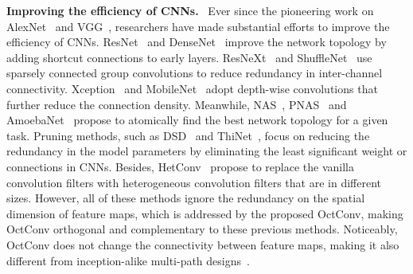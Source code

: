 \documentclass[10pt,twocolumn,letterpaper]{article}
\newcommand{\hiConv}[0]{OctConv\xspace}
\newcommand{\myparagraph}[1]{\vspace{1pt}\noindent\textbf{#1.}~}
\begin{document}
\myparagraph{Improving the efficiency of CNNs}
Ever since the pioneering work on AlexNet~\cite{alexnet} and VGG~\cite{vgg}, researchers have made substantial efforts to improve the efficiency of CNNs. ResNet~\cite{ResNetV1,ResNetV2} and DenseNet~\cite{densenet} improve the network topology by adding shortcut connections to early layers. ResNeXt~\cite{ResNeXt} and ShuffleNet~\cite{ShuffleNetV1} use sparsely connected group convolutions to reduce redundancy in inter-channel connectivity. Xception~\cite{xception} and MobileNet~\cite{MobileNetV1,MobileNetV2} adopt depth-wise convolutions that further reduce the connection density. Meanwhile, NAS~\cite{NASNet}, PNAS~\cite{PNASNet} and AmoebaNet~\cite{AmoebaNet} propose to atomically find the best network topology for a given task. Pruning methods, such as DSD~\cite{DSD} and ThiNet~\cite{ThiNet}, focus on reducing the redundancy in the model parameters by eliminating the least significant weight or connections in CNNs. Besides, HetConv~\cite{HetConv} propose to replace the vanilla convolution filters with heterogeneous convolution filters that are in different sizes. However, all of these methods ignore the redundancy on the spatial dimension of feature maps, which is addressed by the proposed \hiConv, making \hiConv orthogonal and complementary to these previous methods. Noticeably, \hiConv does not change the connectivity between feature maps, making it also different from inception-alike multi-path designs~\cite{InceptionV1,InceptionV4,ResNeXt}.
\end{document}
